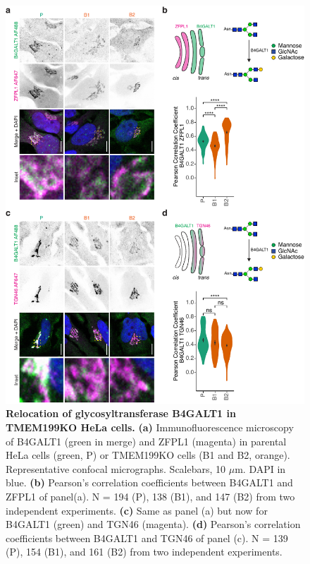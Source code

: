 \clearpage

\begin{figure}
    \includegraphics[keepaspectratio=true,width=\textwidth,height=\textheight]{chapters/chapter4/chapter4_SupplementaryFigure2.pdf}
    \caption{\textbf{Relocation of glycosyltransferase B4GALT1 in TMEM199KO HeLa cells.} \textbf{(a)} Immunofluorescence microscopy of B4GALT1 (green in merge) and ZFPL1 (magenta) in parental HeLa cells (green, P) or TMEM199KO cells (B1 and B2, orange). Representative confocal micrographs. Scalebars, 10 $\mu$m. DAPI in blue. \textbf{(b)} Pearson’s correlation coefficients between B4GALT1 and ZFPL1 of panel(a). N = 194 (P), 138 (B1), and 147 (B2) from two independent experiments. \textbf{(c)} Same as panel (a) but now for B4GALT1 (green) and TGN46 (magenta). \textbf{(d)} Pearson’s correlation coefficients between B4GALT1 and TGN46 of panel (c). N = 139 (P), 154 (B1), and 161 (B2) from two independent experiments.}
    \label{fig:ch4supfig2}
\end{figure}

